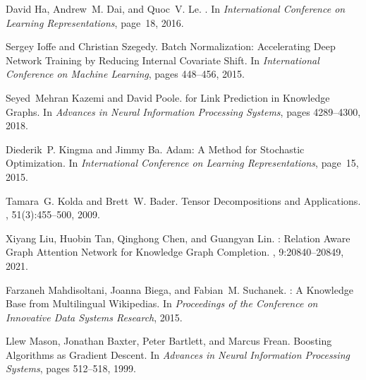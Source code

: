 \documentclass{article}
\theoremstyle{plain}
\theoremstyle{remark}
\begin{document}
\begin{thebibliography}{}
David Ha, Andrew~M. Dai, and Quoc~V. Le.
.
\newblock In {\em International {{Conference}} on {{Learning
  Representations}}}, page~18, 2016.

Sergey Ioffe and Christian Szegedy.
\newblock Batch {{Normalization}}: {{Accelerating Deep Network Training}} by
  {{Reducing Internal Covariate Shift}}.
\newblock In {\em International {{Conference}} on {{Machine Learning}}}, pages
  448--456, 2015.

Seyed~Mehran Kazemi and David Poole.
 for {{Link Prediction}} in {{Knowledge Graphs}}.
\newblock In {\em Advances in {{Neural Information Processing Systems}}}, pages
  4289--4300, 2018.

Diederik~P. Kingma and Jimmy Ba.
\newblock Adam: {{A Method}} for {{Stochastic Optimization}}.
\newblock In {\em International {{Conference}} on {{Learning
  Representations}}}, page~15, 2015.

Tamara~G. Kolda and Brett~W. Bader.
\newblock Tensor {{Decompositions}} and {{Applications}}.
, 51(3):455--500, 2009.

Xiyang Liu, Huobin Tan, Qinghong Chen, and Guangyan Lin.
: {{Relation Aware Graph Attention Network}} for {{Knowledge
  Graph Completion}}.
, 9:20840--20849, 2021.

Farzaneh Mahdisoltani, Joanna Biega, and Fabian~M. Suchanek.
: {{A Knowledge Base}} from {{Multilingual Wikipedias}}.
\newblock In {\em Proceedings of the {{Conference}} on {{Innovative Data
  Systems Research}}}, 2015.

Llew Mason, Jonathan Baxter, Peter Bartlett, and Marcus Frean.
\newblock Boosting {{Algorithms}} as {{Gradient Descent}}.
\newblock In {\em Advances in {{Neural Information Processing Systems}}}, pages
  512--518, 1999.


\end{thebibliography}
\end{document}
